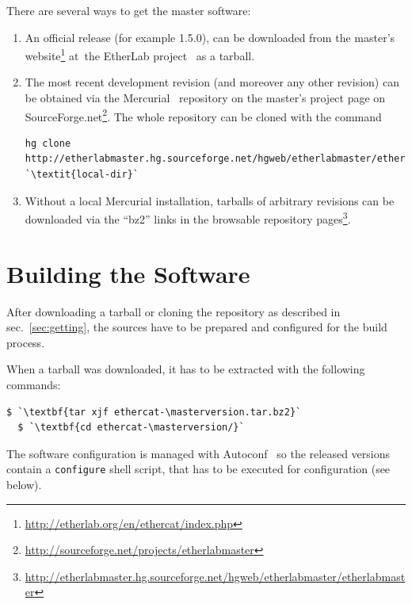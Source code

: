 \documentclass[a4paper,12pt,BCOR6mm,bibtotoc,idxtotoc]{scrbook}
\newcommand{\masterversion}{1.5.0}
\begin{document}
There are several ways to get the master software:

\begin{enumerate}

\item An official release (for example \masterversion), can be downloaded from
the master's website\footnote{\url{http://etherlab.org/en/ethercat/index.php}}
at~the EtherLab project~\cite{etherlab} as a tarball.

\item The most recent development revision (and moreover any other revision)
can be obtained via the Mercurial~\cite{mercurial} repository on the master's
project page on
SourceForge.net\footnote{\url{http://sourceforge.net/projects/etherlabmaster}}.
The whole repository can be cloned with the command

\begin{lstlisting}[breaklines=true]
hg clone http://etherlabmaster.hg.sourceforge.net/hgweb/etherlabmaster/etherlabmaster `\textit{local-dir}`
\end{lstlisting}

\item Without a local Mercurial installation, tarballs of arbitrary revisions
can be downloaded via the ``bz2'' links in the browsable repository
pages\footnote{\url{http://etherlabmaster.hg.sourceforge.net/hgweb/etherlabmaster/etherlabmaster}}.

\end{enumerate}

\section{Building the Software}

After downloading a tarball or cloning the repository as described in
sec.~\ref{sec:getting}, the sources have to be prepared and configured for the
build process.

When a tarball was downloaded, it has to be extracted with the following
commands:

\begin{lstlisting}[gobble=2]
  $ `\textbf{tar xjf ethercat-\masterversion.tar.bz2}`
  $ `\textbf{cd ethercat-\masterversion/}`
\end{lstlisting}

The software configuration is managed with Autoconf~\cite{autoconf} so the
released versions contain a \lstinline+configure+ shell script, that has to be
executed for configuration (see below).
\end{document}

